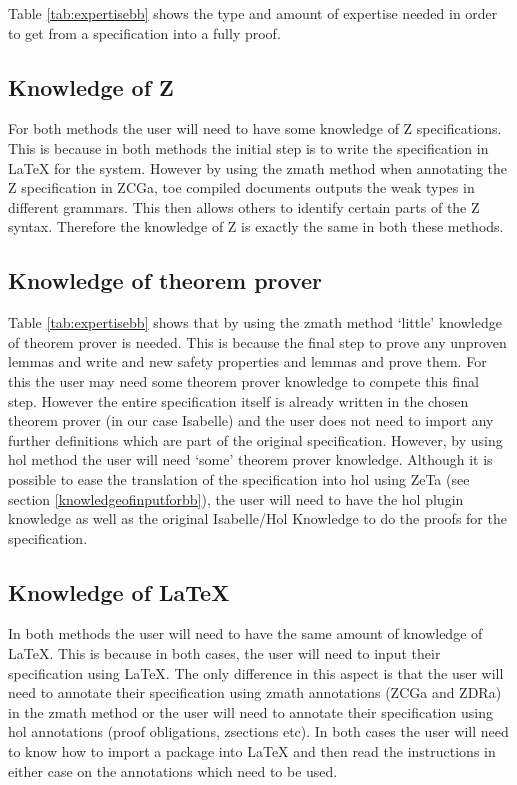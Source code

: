 Table \ref{tab:expertisebb} shows the type and amount of expertise needed in
order to get from a specification into a fully proof.

\subsection{Knowledge of Z}

For both methods the user will need to have some knowledge of Z specifications.
This is because in both methods the initial step is to write the specification
in \LaTeX{} for the system. However by using the \gls{zmath} method when
annotating the Z specification in ZCGa, toe compiled documents outputs the weak
types in different grammars. This then allows others to identify certain parts
of the Z syntax. Therefore the knowledge of Z is exactly the same in both these
methods.

\subsection{Knowledge of theorem prover}

Table \ref{tab:expertisebb} shows that by using the \gls{zmath} method `little'
knowledge of theorem prover is needed. This is because the final step to prove
any unproven lemmas and write and new safety properties and lemmas and prove
them. For this the user may need some theorem prover knowledge to compete this
final step. However the entire specification itself is already written in the
chosen theorem prover (in our case Isabelle) and the user does not need to
import any further definitions which are part of the original specification.
However, by using \gls{hol} method the user will need `some' theorem prover
knowledge. Although it is possible to ease the translation of the specification
into \gls{hol} using ZeTa (see section \ref{knowledgeofinputforbb}), the user
will need to have the \gls{hol} plugin knowledge as well as the original
Isabelle/Hol Knowledge to do the proofs for the specification.

\subsection{Knowledge of \LaTeX}

In both methods the user will need to have the same amount of knowledge of
\LaTeX{}. This is because in both cases, the user will need to input their
specification using \LaTeX{}. The only difference in this aspect is that the
user will need to annotate their specification using \gls{zmath} annotations
(ZCGa and ZDRa) in the \gls{zmath} method or the user will need to annotate
their specification using \gls{hol} annotations (proof obligations, zsections
etc). In both cases the user will need to know how to import a package into
\LaTeX{} and then read the instructions in either case on the annotations which
need to be used.


